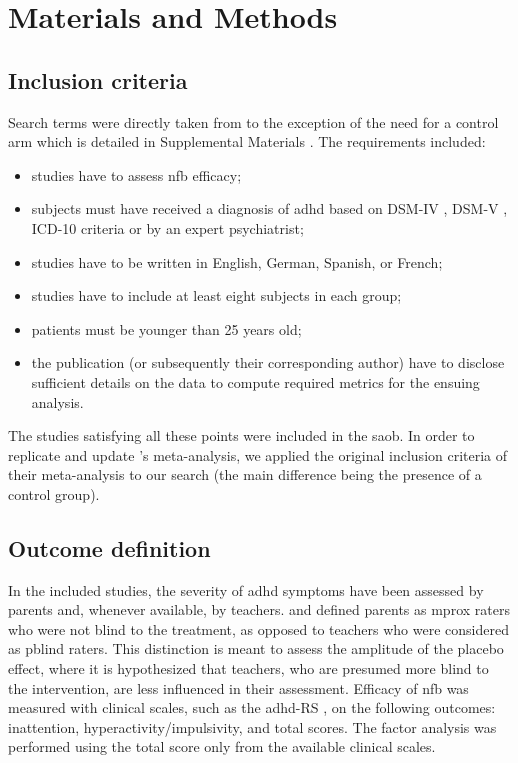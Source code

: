 

\section{Materials and Methods}

\subsection{Inclusion criteria}

Search terms were directly taken from \citet{Cortese2016} to the exception of the need for a control arm 
which is detailed in Supplemental Materials \citep{Supplementalmaterial}. The requirements included:
\begin{itemize}
	\item studies have to assess \gls{nfb} efficacy; 
	\item subjects must have received a diagnosis of \gls{adhd} based on DSM-IV \citep{DSM-4}, DSM-V \citep{DSM-5}, 
	ICD-10 \citep{ICD101993} criteria or by an expert psychiatrist; 
	\item studies have to be written in English, German, Spanish, or French;
	\item studies have to include at least eight subjects in each group;
	\item patients must be younger than 25 years old;
  \item the publication (or subsequently their corresponding author) have to disclose sufficient details on the data
	to compute required metrics for the ensuing analysis.
\end{itemize} 
The studies satisfying all these points were included in the \gls{saob}.
In order to replicate and update \citeauthor{Cortese2016}'s meta-analysis, we applied the original inclusion criteria of 
their meta-analysis to our search (the main difference being the presence of a control group). 

\subsection{Outcome definition} 

In the included studies, the severity of \gls{adhd} symptoms have been assessed by parents and, whenever available, 
by teachers. \citet{Cortese2016} and \citet{Micoulaud2014} defined parents as \gls{mprox} raters who were 
not blind to the treatment, as opposed to teachers who were considered as \gls{pblind} raters. 
This distinction is meant to assess the amplitude of the placebo effect, where it is hypothesized that teachers, 
who are presumed more blind to the intervention, are less influenced in their assessment. 
Efficacy of \gls{nfb} was measured with clinical scales, such as the \gls{adhd}-RS \citep{Pappas2006}, 
on the following outcomes: inattention, hyperactivity/impulsivity, and total scores. The factor analysis was 
performed using the total score only from the available clinical scales.

